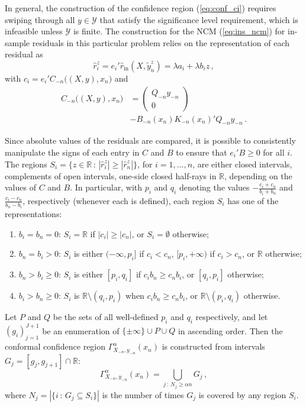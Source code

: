 \documentclass{ITaSconf}
\newcommand{\Ycal}{\mathcal{Y}}
\newcommand{\Real}{\mathbb{R}}
\begin{document}
In general, the construction of the confidence region (\ref{eq:conf_ci}) requires
swiping through all $y\in \Ycal$ that satisfy the significance level requirement,
which is infeasible unless $\Ycal$ is finite. The construction for the NCM (\ref{eq:ins_ncm})
for in-sample residuals in this particular problem relies on the representation
of each residual as
\begin{equation*}
  \hat{r}_i^z
    = e_i' \hat{r}_{\text{in}}(X, \tilde{y}_n^z)
    = \lambda a_i + \lambda b_i z
    \,,
\end{equation*}
with $c_i = e_i' C_{-n}\bigl((X, y), x_n\bigr)$ and
\begin{align*}
  C_{-n}\bigl((X, y), x_n\bigr)
    &= \begin{pmatrix} Q_{-n} y_{-n} \\ 0 \end{pmatrix} \\
    &- B_{-n}(x_n) K_{-n}(x_n)' Q_{-n} y_{-n}
    \,.
\end{align*}

Since absolute values of the residuals are compared, it is possible to consistently
manipulate the signs of each entry in $C$ and $B$ to ensure that $e_i'B\geq 0$ for
all $i$. The regions $S_i = \{z\in\Real\,:\, |\hat{r}_i^z| \geq |\hat{r}_n^z|\}$, for
$i=1,\ldots, n$, are either closed intervals, complements of open intervals,
one-side closed half-rays in $\Real$, depending on the values of $C$ and $B$. In
particular, with $p_i$ and $q_i$ denoting the values $-\frac{c_i+c_n}{b_i+b_n}$ and
$\frac{c_i-c_n}{b_n-b_i}$, respectively (whenever each is defined), each region
$S_i$ has one of the representations:
\begin{enumerate}
  \item $b_i=b_n=0$: $S_i = \Real$ if $|c_i| \geq |c_n|$, or $S_i = \emptyset$
  otherwise;
  \item $b_n = b_i > 0$: $S_i$ is either $(-\infty, p_i]$ if $c_i < c_n$, $[p_i, +\infty)$ if
  $c_i > c_n$, or $\Real$ otherwise;
  \item $b_n > b_i \geq 0$: $S_i$ is either $[p_i, q_i]$ if $c_i b_n \geq c_n b_i$,
  or $[q_i, p_i]$ otherwise;
  \item $b_i > b_n \geq 0$: $S_i$ is $\Real\setminus (q_i, p_i)$ when $c_i b_n \geq c_n b_i$,
  or $\Real\setminus (p_i, q_i)$ otherwise.
\end{enumerate}
Let $P$ and $Q$ be the sets of all well-defined $p_i$ and $q_i$ respectively, and let
$(g_i)_{j=1}^{J+1}$ be an enumeration of $\{\pm\infty\}\cup P \cup Q$ in ascending
order. Then the conformal confidence region $\Gamma_{X_{-n}, y_{-n}}^\alpha(x_n)$ is
constructed from intervals $G_j = [g_j, g_{j+1}] \cap \Real$:
\begin{equation*} \label{eq:rrcm_conf_ci}
  \Gamma_{X_{-n}, y_{-n}}^\alpha(x_n)
    = \bigcup_{j\,:\, N_j \geq \alpha n} G_j
    \,,
\end{equation*}
where $N_j = |\{i\,:\,G_j \subseteq S_i\}|$ is the number of times $G_j$ is covered
by any region $S_i$.
\end{document}
